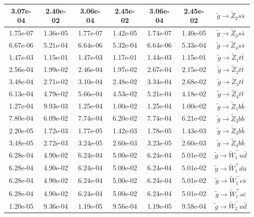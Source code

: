\documentclass[final,3p,times]{elsarticle}
\begin{document}
\begin{center}
\begin{table}
\begin{tabular}{|c|c|c|c|c|c|c|}
3.07e-04 & 2.40e-02 & 3.06e-04 & 2.45e-02 & 3.06e-04 & 2.45e-02 & $\tilde{g} \rightarrow \tilde{Z}_2 s \bar{s}$ \\ \hline
1.75e-07 & 1.36e-05 & 1.77e-07 & 1.42e-05 & 1.74e-07 & 1.40e-05 & $\tilde{g} \rightarrow \tilde{Z}_3 s \bar{s}$ \\ \hline
6.67e-06 & 5.21e-04 & 6.64e-06 & 5.32e-04 & 6.64e-06 & 5.33e-04  & $\tilde{g} \rightarrow \tilde{Z}_4 s \bar{s}$ \\ \hline
1.47e-03 & 1.15e-01 & 1.47e-03 & 1.17e-01 & 1.44e-03 & 1.15e-01 & $\tilde{g} \rightarrow \tilde{Z}_1 t \bar{t}$ \\ \hline
2.56e-04 & 1.99e-02 & 2.46e-04 & 1.97e-02 & 2.67e-04 & 2.15e-02 & $\tilde{g} \rightarrow \tilde{Z}_2 t \bar{t}$ \\ \hline
3.48e-04 & 2.71e-02 & 3.10e-04 & 2.48e-02 & 3.34e-04 & 2.68e-02 & $\tilde{g} \rightarrow \tilde{Z}_3 t \bar{t}$ \\ \hline
6.13e-04 & 4.79e-02 & 5.66e-04 & 4.53e-02 & 5.21e-04 & 4.18e-02 & $\tilde{g} \rightarrow \tilde{Z}_4 t \bar{t}$ \\ \hline
1.27e-04 & 9.93e-03 & 1.25e-04 & 1.00e-02 & 1.25e-04 & 1.00e-02 & $\tilde{g} \rightarrow \tilde{Z}_1 b \bar{b}$ \\ \hline
7.80e-04 & 6.09e-02 & 7.74e-04 & 6.20e-02 & 7.74e-04 & 6.21e-02 & $\tilde{g} \rightarrow \tilde{Z}_2 b \bar{b}$ \\ \hline
2.20e-05 & 1.72e-03 & 1.77e-05 & 1.42e-03 & 1.78e-05 & 1.43e-03 & $\tilde{g} \rightarrow \tilde{Z}_3 b \bar{b}$ \\ \hline
3.48e-05 & 2.72e-03 & 3.24e-05 & 2.60e-03 & 3.23e-05 & 2.60e-03 & $\tilde{g} \rightarrow \tilde{Z}_4 b \bar{b}$ \\ \hline
6.28e-04 & 4.90e-02 & 6.24e-04 & 5.00e-02 & 6.24e-04 & 5.01e-02 & $\tilde{g} \rightarrow \tilde{W}_1^- u \bar{d}$ \\ \hline
6.28e-04 & 4.90e-02 & 6.24e-04 & 5.00e-02 & 6.24e-04 & 5.01e-02 & $\tilde{g} \rightarrow \tilde{W}_1^+ d \bar{u}$ \\ \hline
6.28e-04 & 4.90e-02 & 6.24e-04 & 5.00e-02 & 6.24e-04 & 5.01e-02 & $\tilde{g} \rightarrow \tilde{W}_1^- c \bar{s}$ \\ \hline
6.28e-04 & 4.90e-02 & 6.24e-04 & 5.00e-02 & 6.24e-04 & 5.01e-02 & $\tilde{g} \rightarrow \tilde{W}_1^+ s \bar{c}$ \\ \hline
1.20e-05 & 9.36e-04 & 1.19e-05 & 9.56e-04 & 1.19e-05 & 9.58e-04 & $\tilde{g} \rightarrow \tilde{W}_2^- u \bar{d}$ \\ \hline

\end{tabular}
\end{table}
\end{center}
\end{document}
